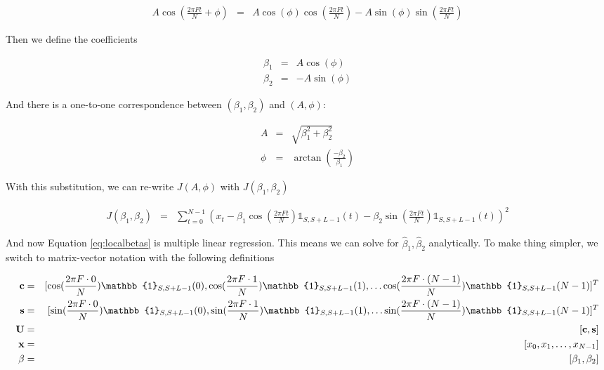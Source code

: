 \documentclass[11pt]{article}
\theoremstyle{plain}
\theoremstyle{definition}
\begin{document}
\begin{eqnarray}
	A \cos(\frac{2 \pi F t}{N} + \phi) &=& A\cos(\phi)\cos(\frac{2 \pi F t}{N})  - A \sin(\phi) \sin(\frac{2 \pi F t}{N})
\end{eqnarray}

\noindent Then we define the coefficients

\begin{eqnarray}
	\beta_1 &=& A \cos(\phi) \nonumber \\
	\beta_2 &=& -A \sin(\phi)
\end{eqnarray}

\noindent And there is a one-to-one correspondence between $(\beta_1, \beta_2)$ and $(A, \phi)$:

\begin{eqnarray}
\label{eq:aptobeta}
	A &=& \sqrt{\beta_1^2 + \beta_2^2} \nonumber \\
	\phi &=& \arctan(\frac{-\beta_2}{\beta_1})
\end{eqnarray}

\noindent With this substitution, we can re-write  $J(A, \phi)$ with $J(\beta_1, \beta_2)$

\begin{eqnarray}
\label{eq:localbetas}
	J(\beta_1, \beta_2) &=& \sum_{t=0}^{N-1} (x_t - \beta_1 \cos(\frac{2 \pi F t}{N})  \mathbb{1}_{S, S+L-1}(t) - \beta_2 \sin(\frac{2 \pi F t}{N}) \mathbb{1}_{S, S+L-1}(t))^2
\end{eqnarray}

And now Equation \ref{eq:localbetas} is multiple linear regression. This means we can solve for $\hat{\beta}_1, \hat{\beta}_2$ analytically. To make thing simpler, we switch to matrix-vector notation with the following definitions

\begin{eqnarray}
	{\bf c} &=& [\cos(\frac{2 \pi F \cdot 0}{N}) \mathbb{1}_{S,S+L-1}(0),  \cos(\frac{2 \pi F \cdot 1}{N}) \mathbb{1}_{S,S+L-1}(1), \ldots \cos(\frac{2 \pi F \cdot (N-1)}{N}) \mathbb{1}_{S,S+L-1}(N-1)]^T \nonumber \\
	{\bf s} &=& [\sin(\frac{2 \pi F \cdot 0}{N}) \mathbb{1}_{S,S+L-1}(0),  \sin(\frac{2 \pi F \cdot 1}{N}) \mathbb{1}_{S,S+L-1}(1), \ldots \sin(\frac{2 \pi F \cdot (N-1)}{N}) \mathbb{1}_{S,S+L-1}(N-1)]^T \nonumber \\
	{\bf U} &=& [{\bf c}, {\bf s}] \nonumber \\
	{\bf x} &=& [x_0, x_1, \ldots, x_{N-1}] \nonumber \\
	\beta &=& [\beta_1, \beta_2]
\end{eqnarray}
\end{document}
